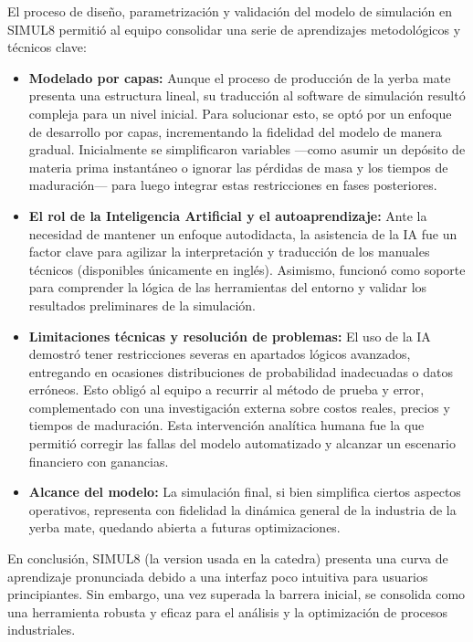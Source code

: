\documentclass[11pt, a4paper]{article}
\begin{document}
El proceso de diseño, parametrización y validación del modelo de simulación en SIMUL8 permitió al equipo consolidar una serie de aprendizajes metodológicos y técnicos clave:

\begin{itemize}
    \item \textbf{Modelado por capas:} Aunque el proceso de producción de la yerba mate presenta una estructura lineal, su traducción al software de simulación resultó compleja para un nivel inicial. Para solucionar esto, se optó por un enfoque de desarrollo por capas, incrementando la fidelidad del modelo de manera gradual. Inicialmente se simplificaron variables —como asumir un depósito de materia prima instantáneo o ignorar las pérdidas de masa y los tiempos de maduración— para luego integrar estas restricciones en fases posteriores.
    \item \textbf{El rol de la Inteligencia Artificial y el autoaprendizaje:} Ante la necesidad de mantener un enfoque autodidacta, la asistencia de la IA fue un factor clave para agilizar la interpretación y traducción de los manuales técnicos (disponibles únicamente en inglés). Asimismo, funcionó como soporte para comprender la lógica de las herramientas del entorno y validar los resultados preliminares de la simulación.
    \item \textbf{Limitaciones técnicas y resolución de problemas:} El uso de la IA demostró tener restricciones severas en apartados lógicos avanzados, entregando en ocasiones distribuciones de probabilidad inadecuadas o datos erróneos. Esto obligó al equipo a recurrir al método de prueba y error, complementado con una investigación externa sobre costos reales, precios y tiempos de maduración. Esta intervención analítica humana fue la que permitió corregir las fallas del modelo automatizado y alcanzar un escenario financiero con ganancias.
    \item \textbf{Alcance del modelo:} La simulación final, si bien simplifica ciertos aspectos operativos, representa con fidelidad la dinámica general de la industria de la yerba mate, quedando abierta a futuras optimizaciones.
\end{itemize}

En conclusión, SIMUL8 (la version usada en la catedra) presenta una curva de aprendizaje pronunciada debido a una interfaz poco intuitiva para usuarios principiantes. Sin embargo, una vez superada la barrera inicial, se consolida como una herramienta robusta y eficaz para el análisis y la optimización de procesos industriales.
\end{document}

